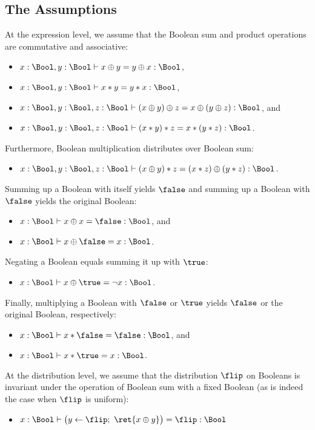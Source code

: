 \subsection{The Assumptions}
At the expression level, we assume that the Boolean sum and product operations are commutative and associative:
\begin{itemize}
\item $x : \Bool, y : \Bool \vdash x \oplus y = y \oplus x : \Bool$,
\item $x : \Bool, y : \Bool \vdash x * y = y * x : \Bool$,
\item $x : \Bool, y : \Bool, z : \Bool \vdash (x \oplus y) \oplus z = x \oplus (y \oplus z) : \Bool$, and
\item $x : \Bool, y : \Bool, z : \Bool \vdash (x * y) * z = x * (y * z) : \Bool$.
\end{itemize}
Furthermore, Boolean multiplication distributes over Boolean sum:
\begin{itemize}
\item $x : \Bool, y : \Bool, z : \Bool \vdash (x \oplus y) * z = (x * z) \oplus (y * z) : \Bool$.
\end{itemize}
Summing up a Boolean with itself yields $\false$ and summing up a Boolean with $\false$ yields the original Boolean:
\begin{itemize}
\item $x : \Bool \vdash x \oplus x = \false : \Bool$, and
\item $x : \Bool \vdash x \oplus \false = x : \Bool$.
\end{itemize}
Negating a Boolean equals summing it up with $\true$:
\begin{itemize}
\item $x : \Bool \vdash x \oplus \true = \neg x : \Bool$.
\end{itemize}
Finally, multiplying a Boolean with $\false$ or $\true$ yields $\false$ or the original Boolean, respectively:
\begin{itemize}
\item $x : \Bool \vdash x * \false = \false : \Bool$, and
\item $x : \Bool \vdash x * \true = x : \Bool$.
\end{itemize}
At the distribution level, we assume that the distribution $\flip$ on Booleans is invariant under the operation of Boolean sum with a fixed Boolean (as is indeed the case when $\flip$ is uniform):
\begin{itemize}
\item $x : \Bool \vdash \big(y \leftarrow \flip; \ \ret{x \oplus y}\big) = \flip : \Bool$
\end{itemize}

